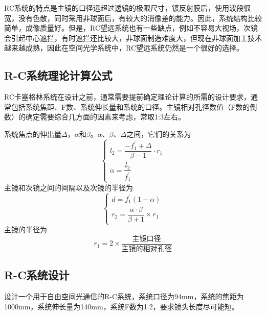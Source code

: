 RC系统的特点是主镜的口径远超过透镜的极限尺寸，镀反射膜后，使用波段很宽，没有色散，同时采用非球面后，有较大的消像差的能力。因此，系统结构比较简单，成像质量好。但是，RC望远系统也有一些缺点，例如不容易大视场，次镜会引起中心遮拦，有时遮拦还比较大，非球面制造难度大，但现在非球面加工技术越来越成熟，因此在空间光学系统中，RC望远系统仍然是一个很好的选择。
\subsection{R-C系统理论计算公式}
RC卡塞格林系统在设计之前，通常需要提前确定理论计算的所需的设计要求，通常包括系统焦距、F数、系统伸长量和系统的口径。主镜相对孔径数值（F数的倒数）的确定需要综合几方面的因素来考虑，常取1:3左右\citep{Li.2015}。

系统焦点的伸出量$ \Delta $，$ \alpha $和$ \beta $。$ \alpha $、$ \beta $、$ \Delta $之间，它们的关系为
\begin{equation}
\left\{ 
\begin{array}{l}  
	l_2 = \dfrac{-f_{1}^{'}+\Delta}{\beta -1}\cdot r_1 
	\\
	\alpha = \dfrac{l_2}{f_1 ^{'}}
\end{array}
\right.  
\end{equation}
主镜和次镜之间的间隔以及次镜的半径为
\begin{equation}
\left\{  \begin{array}{l}   d = f_1^{'}(1-\alpha) \\
	 r_2 = \dfrac{\alpha \cdot \beta}{\beta + 1}\times r_1 \end{array} \right.
\end{equation}
主镜的半径为
\begin{equation}\label{key1}
r_1 = 2 \times \dfrac{\text{主镜口径}}{\text{主镜的相对孔径}}
\end{equation}

\subsection{R-C系统设计}
设计一个用于自由空间光通信的R-C系统，系统口径为94mm，系统的焦距为1000mm，系统伸长量为140mm，系统F数为1.2，要求镜头长度尽可能短。


